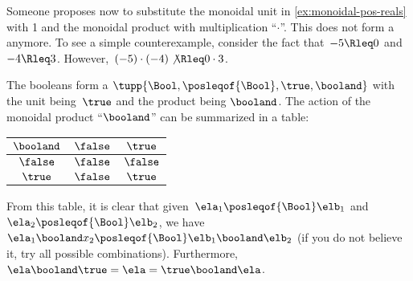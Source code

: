 \begin{counterexample}
    Someone proposes now to substitute the monoidal unit in \cref{ex:monoidal-pos-reals} with 1 and the monoidal product with multiplication ``$\cdot$''.
    This does not form a  anymore.
    To see a simple counterexample, consider the fact that~$-5\Rleq 0$ and~$-4\Rleq 3$.
    However,~$(-5)\cdot (-4) \not{\Rleq} 0 \cdot 3$.
\end{counterexample}

\begin{example}
    The booleans form a  $\tupp{\Bool,\posleqof{\Bool},\true,\booland}$
    with the unit being~$\true$ and the product being $\booland$.
    The action of the monoidal product ``$\booland$'' can be summarized in a table:
    \begin{center}
        \begin{tabular}{c|cc}
            $\booland$ & $\false$ & $\true$ \\
            \hline
            $\false$   & $\false$ & $\false$ \\
            $\true$    & $\false$ & $\true$
        \end{tabular}
    \end{center}
    From this table, it is clear that given~$\ela_1\posleqof{\Bool}\elb_1$ and~$\ela_2\posleqof{\Bool} \elb_2$, we have~$\ela_1\booland x_2\posleqof{\Bool} \elb_1\booland \elb_2$ (if you do not believe it, try all possible combinations).
    Furthermore,~$\ela\booland \true=\ela=\true \booland \ela$.
\end{example}

